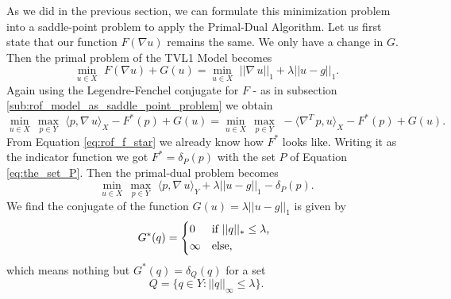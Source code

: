         As we did in the previous section, we can formulate this minimization problem into a saddle-point problem to apply the Primal-Dual Algorithm. Let us first state that our function $F(\nabla u)$ remains the same. We only have a change in $G$. Then the primal problem of the TVL1 Model becomes
            \begin{equation}
                \min_{u \in X}\,\, F(\nabla u) + G(u) = \min_{u \in X}\,\, ||\nabla \, u||_{1} + \lambda ||u - g||_{1}.
                \label{eq:primal_tvl1_problem}
            \end{equation}
        Again using the Legendre-Fenchel conjugate for $F$ - as in subsection \ref{sub:rof_model_as_saddle_point_problem} we obtain
            \begin{equation}
                \min_{u \in X}\, \max_{p \in Y}\,\, \langle p, \nabla \, u \rangle_{X} - F^{\ast}(p) + G(u) = \min_{u \in X}\, \max_{p \in Y}\,\, -\langle \nabla^{T}\,p, u \rangle_{X} - F^{\ast}(p) + G(u).
            \end{equation}
        From Equation \ref{eq:rof_f_star} we already know how $F^{\ast}$ looks like. Writing it as the indicator function we got $F^{\ast} = \delta_{P}(p)$ with the set $P$ of Equation \ref{eq:the_set_P}. Then the primal-dual problem becomes
            \begin{equation}
                \min_{u \in X}\, \max_{p \in Y}\,\, \langle p, \nabla\, u \rangle_{Y} + \lambda ||u - g||_{1} - \delta_{P}(p).
            \label{eq:primal_dual_tvl1_problem}
            \end{equation}
        We find the conjugate of the function $G(u) = \lambda||u-g||_{1}$ is given by
            \begin{equation}
                G^{\ast}(q) =
                    \begin{dcases*}
                        0 & \textnormal{if $||q||_{\ast} \le \lambda$,} \\
                        \infty & \textnormal{else},
                    \end{dcases*}
                \label{eq:tvl1_g_star}
            \end{equation}
        which means nothing but $G^{\ast}(q) = \delta_{Q}(q)$ for a set
            \begin{equation}
                Q = \big\{ q \in Y : ||q||_{\infty} \le \lambda \big\}.
            \label{eq:the_set_Q}
            \end{equation}

